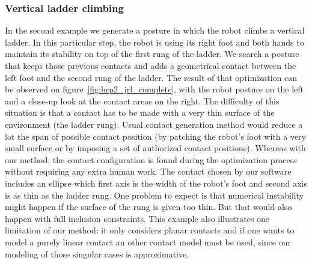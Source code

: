 \subsubsection{Vertical ladder climbing}
\label{subsubsec:ladder}


In the second example we generate a posture in which the robot climbs a vertical ladder.
In this particular step, the robot is using its right foot and both hands to maintain its stability on top of the first rung of the ladder.
We search a posture that keeps those previous contacts and adds a geometrical contact between the left foot and the second rung of the ladder.
The result of that optimization can be observed on figure~\ref{fig:hrp2_jrl_complete}, with the robot posture on the left and a close-up look at the contact areas on the right.
The difficulty of this situation is that a contact has to be made with a very thin surface of the environment (the ladder rung).
Usual contact generation method would reduce a lot the span of possible contact position (by patching the robot's foot with a very small surface or by imposing a set of authorized contact positions).
Whereas with our method, the contact configuration is found during the optimization process without requiring any extra human work.
The contact chosen by our software includes an ellipse which first axis is the width of the robot's foot and second axis is as thin as the ladder rung.
One problem to expect is that numerical instability might happen if the surface of the rung is given too thin.
But that would also happen with full inclusion constraints.
This example also illustrates one limitation of our method: it only considers planar contacts and if one wants to model a purely linear contact an other contact model must be used, since our modeling of those singular cases is approximative.


